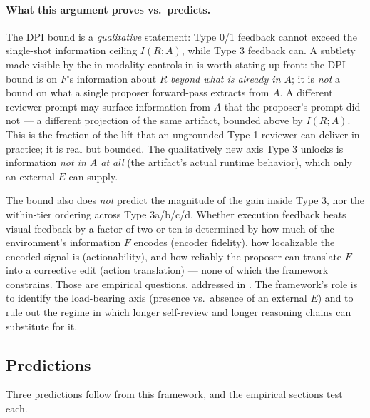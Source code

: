 \documentclass[11pt]{article}
\begin{document}
\paragraph{What this argument proves vs.\ predicts.} The DPI bound is a \emph{qualitative} statement: Type 0/1 feedback cannot exceed the single-shot information ceiling $I(R; A)$, while Type 3 feedback can. A subtlety made visible by the in-modality controls in  is worth stating up front: the DPI bound is on $F$'s information about $R$ \emph{beyond what is already in $A$}; it is \emph{not} a bound on what a single proposer forward-pass extracts from $A$. A different reviewer prompt may surface information from $A$ that the proposer's prompt did not --- a different projection of the same artifact, bounded above by $I(R; A)$. This is the fraction of the lift that an ungrounded Type 1 reviewer can deliver in practice; it is real but bounded. The qualitatively new axis Type 3 unlocks is information \emph{not in $A$ at all} (the artifact's actual runtime behavior), which only an external $E$ can supply.

The bound also does \emph{not} predict the magnitude of the gain inside Type 3, nor the within-tier ordering across Type 3a/b/c/d. Whether execution feedback beats visual feedback by a factor of two or ten is determined by how much of the environment's information $F$ encodes (encoder fidelity), how localizable the encoded signal is (actionability), and how reliably the proposer can translate $F$ into a corrective edit (action translation) --- none of which the framework constrains. Those are empirical questions, addressed in . The framework's role is to identify the load-bearing axis (presence vs.\ absence of an external $E$) and to rule out the regime in which longer self-review and longer reasoning chains can substitute for it.

\subsection{Predictions}
\label{sec:predictions}

Three predictions follow from this framework, and the empirical sections test each.
\end{document}
